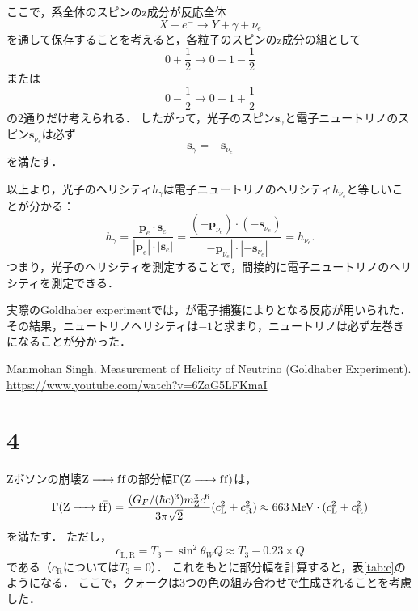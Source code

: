 \documentclass[a4paper,11pt]{jsarticle}
\begin{document}
ここで，系全体のスピンのz成分が反応全体
\begin{equation}
  X + e^- \to Y + \gamma + \nu_{e}
\end{equation}
を通して保存することを考えると，各粒子のスピンのz成分の組として
\begin{equation}
  0 + \frac{1}{2} \to 0 + 1 - \frac{1}{2} 
\end{equation}
または
\begin{equation}
  0 - \frac{1}{2} \to 0 - 1 + \frac{1}{2} 
\end{equation}
の2通りだけ考えられる．
したがって，光子のスピン$\bm{s}_{\gamma}$と電子ニュートリノのスピン$\bm{s}_{\nu_e}$は必ず
\begin{equation}
  \bm{s}_{\gamma} = -\bm{s}_{\nu_e}
\end{equation}
を満たす．

以上より，光子のヘリシティ$h_{\gamma}$は電子ニュートリノのヘリシティ$h_{\nu_e}$と等しいことが分かる：
\begin{equation}
  h_{\gamma} = \frac{\bm{p}_e\cdot \bm{s}_e}{\left|\bm{p}_e\right|\cdot\left|\bm{s}_e\right|} = \frac{(-\bm{p}_{\nu_e})\cdot (-\bm{s}_{\nu_e})}{\left|-\bm{p}_{\nu_e}\right|\cdot\left|-\bm{s}_{\nu_e}\right|} =  h_{\nu_e}.
\end{equation}
つまり，光子のヘリシティを測定することで，間接的に電子ニュートリノのヘリシティを測定できる．

実際のGoldhaber experimentでは，が電子捕獲によりとなる反応が用いられた．
その結果，ニュートリノヘリシティは$-1$と求まり，ニュートリノは必ず左巻きになることが分かった．

\begin{thebibliography}{99}
   Manmohan Singh. Measurement of Helicity of Neutrino (Goldhaber Experiment). \\
  \url{https://www.youtube.com/watch?v=6ZaG5LFKmaI} 
\end{thebibliography}

\section*{4}

Zボソンの崩壊$\ce{Z -> f}\bar{\mathrm{f}}$の部分幅$\Gamma(\ce{Z -> f}\bar{\mathrm{f}})$は，
\begin{equation}
  \Gamma(\ce{Z -> f}\bar{\mathrm{f}}) = \frac{(G_F/(\hbar c)^3) m_{\mathrm{Z}}^3c^6}{3\pi\sqrt{2}} (c_{\mathrm{L}}^2+c_{\mathrm{R}}^2) \approx \SI{663}{\MeV} \cdot (c_{\mathrm{L}}^2+c_{\mathrm{R}}^2)
\end{equation}
を満たす．
ただし，
\begin{equation}
  c_{\mathrm{L,R}} = T_3 - \sin^2{\theta_W}Q \approx T_3 - 0.23\times Q
\end{equation}
である（$c_{\mathrm{R}}$については$T_3 = 0$）．
これをもとに部分幅を計算すると，表\ref{tab:c}のようになる．
ここで，クォークは3つの色の組み合わせで生成されることを考慮した．
\end{document}
